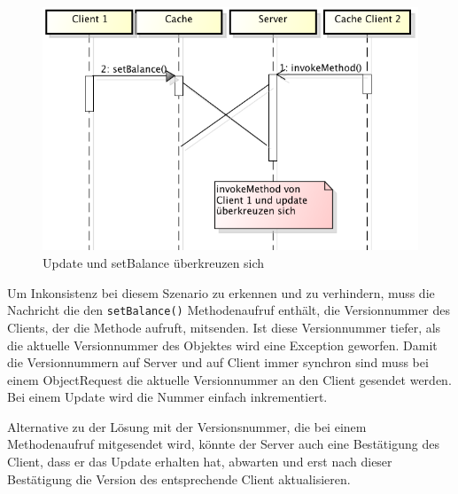 \begin{figure}[h]
  \centering
\includegraphics[scale=0.6]{images_objectcaching/conflictCross}  
  \caption{Update und setBalance überkreuzen sich}
  \label{fig:messagecross}
\end{figure}


Um Inkonsistenz bei diesem Szenario zu erkennen und zu verhindern, muss die Nachricht die den \verb|setBalance()| Methodenaufruf enthält, die Versionnummer des Clients, der die Methode aufruft, mitsenden. Ist diese Versionnummer tiefer, als die aktuelle Versionnummer des Objektes wird eine Exception geworfen. Damit die Versionnummern auf Server und auf Client immer synchron sind muss bei einem ObjectRequest die aktuelle Versionnummer an den Client gesendet werden. Bei einem Update wird die Nummer einfach inkrementiert.

Alternative zu der Lösung mit der Versionsnummer, die bei einem Methodenaufruf mitgesendet wird, könnte der Server auch eine Bestätigung des Client, dass er das Update erhalten hat, abwarten und erst nach dieser Bestätigung die Version des entsprechende Client aktualisieren.


